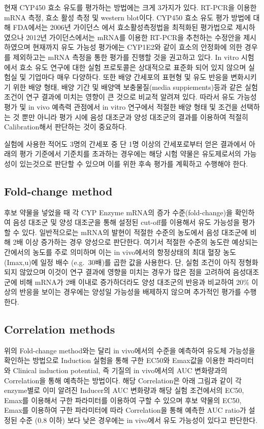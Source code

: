 \documentclass[
  11pt,
  krantz2, a4paper, twoside]{krantz}
\begin{document}
현재 CYP450 효소 유도를 평가하는 방법에는 크게 3가지가 있다. RT-PCR을 이용한 mRNA 측정, 효소 활성 측정 및 western blot이다. CYP450 효소 유도 평가 방법에 대해 FDA에서는 2006년 가이던스 에서 효소활성측정법을 최적화된 평가법으로 제시하였으나 2012년 가이던스에서는 mRNA를 이용한 RT-PCR을 추천하는 수정안을 제시하였으며 현재까지 유도 가능성 평가에는 CYP1E2와 같이 효소의 안정화에 의한 경우를 제외하고는 mRNA 측정을 통한 평가를 진행할 것을 권고하고 있다. In vitro 시험에서 효소 유도 연구에 대한 실험 프로토콜은 상대적으로 표준화 되어 있지 않으며 실험실 및 기업마다 매우 다양하다. 또한 배양 간세포의 표현형 및 유도 반응을 변화시키기 위한 배양 형태, 배양 기간 및 배양액 보충물질(media suppiements)등과
같은 실험 조건이 연구 결과에 미치는 영향이 큰 것으로 비교적 알려져 있다. 따라서 유도 가능성 평가 및 in vivo 예측력 관점에서 in vitro 연구에서 적절한 배양 형태 및 조건을 선택하는 것 뿐만 아니라 평가 시에
음성 대조군과 양성 대조군의 결과를 이용하여 적절히 Calibration해서 판단하는 것이 중요하다.

실험에 사용한 적어도 3명의 간세포 중 단 1명 이상의 간세포로부터 얻은 결과에서 아래의 평가 기준에서 기준치를 초과하는 경우에는 해당 시험 약물은 유도제로서의 가능성이 있는것으로 판단할 수 있으며
이를 위한 후속 평가를 계획하고 수행해야 한다.

\subsection{Fold-change method}\label{fold-change-method}

후보 약물을 넣었을 때 각 CYP Enzyme mRNA의 증가 수준(fold-change)을 확인하여 음성 대조군 및 양성 대조군을 통해 설정된 cut-off를 이용해서 유도 가능성을 평가할 수 있다. 일반적으로는 mRNA의 발현이 적절한 수준의 농도에서 음성 대조군에 비해 2배 이상 증가하는 경우 양성으로 판단한다. 여기서 적절한 수준의 농도란 예상되는 간에서의 농도를 주로 의미하며 이는 in vivo에서의 항정상태의 최대 혈장 농도(Imax,u)에 일정 배수 (e.g.~30배)를 곱한 값을 사용한다. 단, 실험 조건이 아직 정형화 되지 않았으며 이것이 연구 결과에 영향을 미치는 경우가 많은 점을 고려하여 음성대조군에 비해 mRNA가 2배 이내로 증가하더라도 양성 대조군의 반응과 비교하여 20\% 이상의 반응을 보이는 경우에는 양성일 가능성을 배제하지 않으며 추가적인 평가를 수행한다.

\subsection{Correlation methods}\label{correlation-methods}

위의 Fold-change method와는 달리 in vivo에서의 수준을 예측하여 유도체 가능성을 확인하는 방법으로 Induction 실험을 통해 구한 EC50와 Emax값을 이용한 파라미터와 Clinical induction potential, 즉 기질의 in vivo에서의
AUC 변화량과의 Correlation을 통해 예측하는 방법이다. 해당 Correlation은 아래 그림과 같이 각 enzyme별로 이미 알려진 Inducer의 AUC 변화량과 해당 실험 조건에서의 EC50, Emax를 이용해서 구한 파라미터를 이용하여 구할 수 있으며
후보 약물의 EC50, Emax를 이용하여 구한 파라미터에 따라 Correlation을 통해 예측한 AUC ratio가 설정된 수준 (0.8 이하) 보다 낮은 경우에는 in vivo에서 유도 가능성이 있다고 판단한다.
\end{document}
